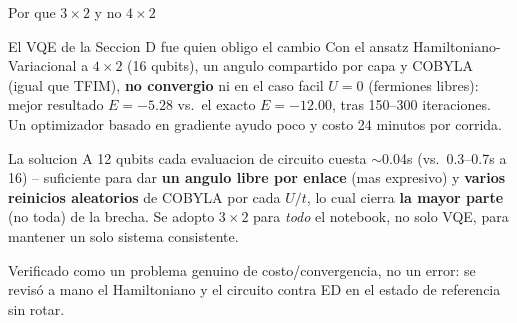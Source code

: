 \documentclass[aspectratio=169,10pt]{beamer}
\newcommand{\good}[1]{\textcolor{qAccent}{\textbf{#1}}}
\newcommand{\warn}[1]{\textcolor{qWarn}{\textbf{#1}}}
\begin{document}
\begin{frame}{Por que $3\times2$ y no $4\times2$}
  \begin{alertblock}{El VQE de la Seccion D fue quien obligo el cambio}
    Con el ansatz Hamiltoniano-Variacional a $4\times2$ (16 qubits), un angulo compartido por
    capa y COBYLA (igual que TFIM), \warn{no convergio} ni en el caso facil $U=0$
    (fermiones libres): mejor resultado $E=-5.28$ vs.\ el exacto $E=-12.00$, tras 150--300
    iteraciones. Un optimizador basado en gradiente ayudo poco y costo 24 minutos por corrida.
  \end{alertblock}
  \begin{block}{La solucion}
    A 12 qubits cada evaluacion de circuito cuesta $\sim$0.04s (vs.\ 0.3--0.7s a 16) --
    suficiente para dar \textbf{un angulo libre por enlace} (mas expresivo) y
    \textbf{varios reinicios aleatorios} de COBYLA por cada $U/t$, lo cual cierra
    \good{la mayor parte} (no toda) de la brecha. Se adopto $3\times2$ para \emph{todo} el
    notebook, no solo VQE, para mantener un solo sistema consistente.
  \end{block}
  \small Verificado como un problema genuino de costo/convergencia, no un error: se revisó a
  mano el Hamiltoniano y el circuito contra ED en el estado de referencia sin rotar.
\end{frame}
\end{document}
